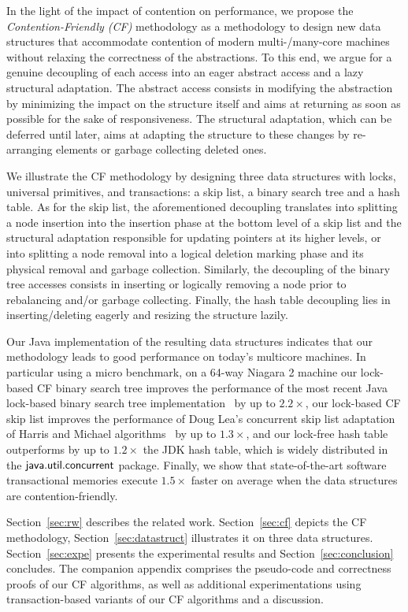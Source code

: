 In the light of the impact of contention on performance, we propose the \emph{Contention-Friendly (CF)}
methodology as a methodology to design new data structures that accommodate contention 
of modern multi-/many-core machines without relaxing the correctness of the abstractions.
To this end, we argue for a genuine decoupling of each access into an
eager abstract access and a lazy structural adaptation.
The abstract access consists in modifying the abstraction by minimizing the impact on the 
structure itself and aims at returning as soon as possible for the sake of responsiveness. 
The structural adaptation, which can be deferred until later, aims at adapting the structure to these changes by re-arranging elements or 
garbage collecting deleted ones.

We illustrate the CF methodology by designing three data structures with locks, universal primitives, and transactions: 
a skip list, a binary search tree and a hash table. 
As for the skip list, the aforementioned decoupling translates into splitting a 
node insertion into the insertion phase at the bottom level of a skip list and the structural 
adaptation responsible for updating pointers at its higher levels, or into splitting a node removal 
into a logical deletion marking phase and its physical removal and garbage collection.
Similarly, the decoupling of the binary tree accesses consists in inserting or logically removing a 
node prior to rebalancing and/or garbage collecting.
Finally, the hash table decoupling lies in inserting/deleting eagerly and resizing the structure lazily.

Our Java implementation of the resulting data structures indicates that our methodology leads to 
good performance on today's multicore machines. 
In particular using a micro benchmark, on a 64-way Niagara 2 machine our lock-based CF binary search tree improves 
the performance of the most recent Java lock-based binary 
search tree implementation~\cite{BCCO10} by up to $2.2\times$, our lock-based CF skip list 
improves the performance of Doug Lea's concurrent skip list adaptation of Harris and Michael algorithms~\cite{Har01,Mic02} by up to 
$1.3\times$, and our lock-free hash table outperforms by up to $1.2\times$ the JDK hash table, which is widely distributed in the $\lit{java.util.concurrent}$ package.
Finally, we show that state-of-the-art software transactional memories 
execute $1.5\times$ faster on average when the data structures are contention-friendly.

Section~\ref{sec:rw} describes the related work. Section~\ref{sec:cf} depicts the CF methodology, Section~\ref{sec:datastruct} illustrates it on three data structures. Section~\ref{sec:expe} presents the experimental results and Section~\ref{sec:conclusion} concludes. The companion appendix comprises the pseudo-code and correctness proofs of our CF algorithms, as well as additional experimentations using transaction-based variants of our CF algorithms and a discussion.

